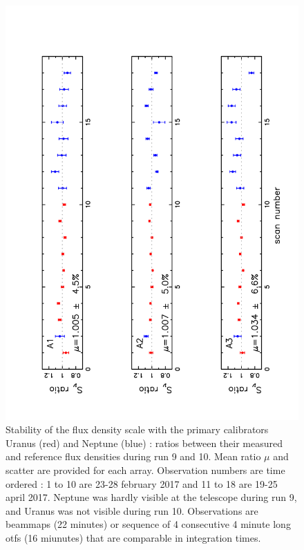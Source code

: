 \begin{figure}
\begin{center}
  \includegraphics[clip, angle=-90, scale=0.6]{Figures/Ura_Nept_r9_10.pdf}
  \caption{Stability of the flux density scale with the primary calibrators Uranus (red) and Neptune (blue) :
    ratios between their measured and reference flux densities during run 9 and 10.
    Mean ratio $\mu$ and scatter are provided for each array.
    Observation numbers are time ordered : 1 to 10 are 23-28 february 2017 and 11 to 18 are 19-25 april 2017.
    Neptune was hardly visible at the telescope during run 9, and Uranus was not visible during run 10.
    Observations are beammaps (22 minutes) or sequence of 4 consecutive 4 minute long otfs (16 miunutes) that are
    comparable in integration times.}
\label{fig:U_N_ratio}
\end{center}
\end{figure}

